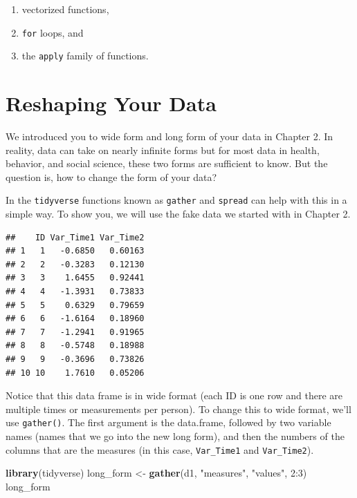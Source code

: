 \documentclass[]{tufte-book}
\newenvironment{Shaded}{}{}
\newcommand{\KeywordTok}[1]{\textcolor[rgb]{0.00,0.44,0.13}{\textbf{#1}}}
\newcommand{\DecValTok}[1]{\textcolor[rgb]{0.25,0.63,0.44}{#1}}
\newcommand{\StringTok}[1]{\textcolor[rgb]{0.25,0.44,0.63}{#1}}
\newcommand{\OperatorTok}[1]{\textcolor[rgb]{0.40,0.40,0.40}{#1}}
\newcommand{\NormalTok}[1]{#1}
\providecommand{\tightlist}{%
  \setlength{\itemsep}{0pt}\setlength{\parskip}{0pt}}
\theoremstyle{definition}
\theoremstyle{definition}
\theoremstyle{remark}
\begin{document}
\begin{enumerate}
\def\labelenumi{\arabic{enumi}.}
\tightlist
\item
  vectorized functions,
\item
  \texttt{for} loops, and
\item
  the \texttt{apply} family of functions.
\end{enumerate}

\section*{Reshaping Your Data}\label{reshaping-your-data}

We introduced you to wide form and long form of your data in Chapter 2.
In reality, data can take on nearly infinite forms but for most data in
health, behavior, and social science, these two forms are sufficient to
know. But the question is, how to change the form of your data?

In the \texttt{tidyverse} functions known as \texttt{gather} and
\texttt{spread} can help with this in a simple way. To show you, we will
use the fake data we started with in Chapter 2.

\begin{verbatim}
##    ID Var_Time1 Var_Time2
## 1   1   -0.6850   0.60163
## 2   2   -0.3283   0.12130
## 3   3    1.6455   0.92441
## 4   4   -1.3931   0.73833
## 5   5    0.6329   0.79659
## 6   6   -1.6164   0.18960
## 7   7   -1.2941   0.91965
## 8   8   -0.5748   0.18988
## 9   9   -0.3696   0.73826
## 10 10    1.7610   0.05206
\end{verbatim}

Notice that this data frame is in wide format (each ID is one row and
there are multiple times or measurements per person). To change this to
wide format, we'll use \texttt{gather()}. The first argument is the
data.frame, followed by two variable names (names that we go into the
new long form), and then the numbers of the columns that are the
measures (in this case, \texttt{Var\_Time1} and \texttt{Var\_Time2}).

\begin{Shaded}
\begin{Highlighting}[]
\KeywordTok{library}\NormalTok{(tidyverse)}
\NormalTok{long_form <-}\StringTok{ }\KeywordTok{gather}\NormalTok{(d1, }\StringTok{"measures"}\NormalTok{, }\StringTok{"values"}\NormalTok{, }
    \DecValTok{2}\OperatorTok{:}\DecValTok{3}\NormalTok{)}
\NormalTok{long_form}
\end{Highlighting}
\end{Shaded}
\end{document}
